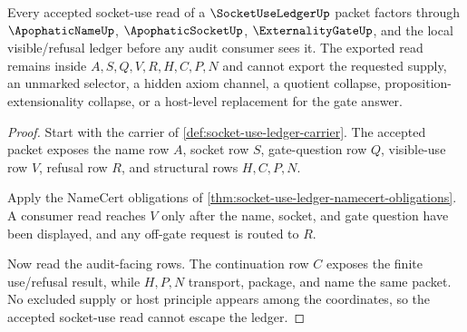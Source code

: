 \begin{theorem}
\label{thm:socket-use-ledger-visible-use-nonescape}
Every accepted socket-use read of a $\SocketUseLedgerUp$ packet factors through $\ApophaticNameUp$, $\ApophaticSocketUp$, $\ExternalityGateUp$, and the local visible/refusal ledger before any audit consumer sees it. The exported read remains inside $A,S,Q,V,R,H,C,P,N$ and cannot export the requested supply, an unmarked selector, a hidden axiom channel, a quotient collapse, proposition-extensionality collapse, or a host-level replacement for the gate answer.
\end{theorem}
\begin{proof}
Start with the carrier of \autoref{def:socket-use-ledger-carrier}. The accepted packet exposes the name row $A$, socket row $S$, gate-question row $Q$, visible-use row $V$, refusal row $R$, and structural rows $H,C,P,N$.

Apply the NameCert obligations of \autoref{thm:socket-use-ledger-namecert-obligations}. A consumer read reaches $V$ only after the name, socket, and gate question have been displayed, and any off-gate request is routed to $R$.

Now read the audit-facing rows. The continuation row $C$ exposes the finite use/refusal result, while $H,P,N$ transport, package, and name the same packet. No excluded supply or host principle appears among the coordinates, so the accepted socket-use read cannot escape the ledger.
\end{proof}

